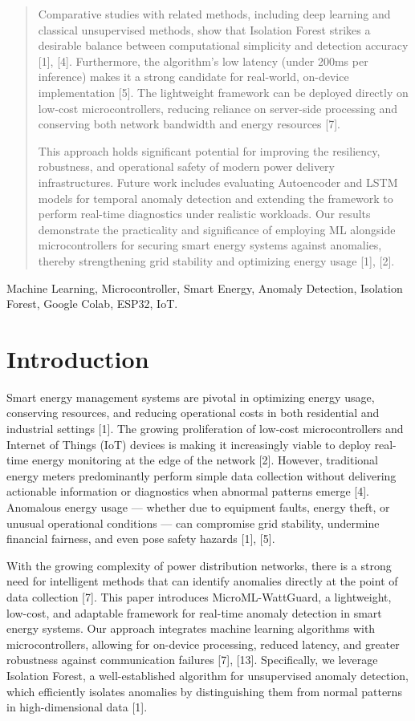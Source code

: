 \documentclass[12pt, draftclsnofoot, onecolumn]{IEEEtran}
\begin{document}
\begin{abstract}
Comparative studies with related methods, including deep learning and classical unsupervised methods, show that Isolation Forest strikes a desirable balance between computational simplicity and detection accuracy [1], [4]. Furthermore, the algorithm’s low latency (under 200ms per inference) makes it a strong candidate for real-world, on-device implementation [5]. The lightweight framework can be deployed directly on low-cost microcontrollers, reducing reliance on server-side processing and conserving both network bandwidth and energy resources [7].

This approach holds significant potential for improving the resiliency, robustness, and operational safety of modern power delivery infrastructures. Future work includes evaluating Autoencoder and LSTM models for temporal anomaly detection and extending the framework to perform real-time diagnostics under realistic workloads. Our results demonstrate the practicality and significance of employing ML alongside microcontrollers for securing smart energy systems against anomalies, thereby strengthening grid stability and optimizing energy usage [1], [2].
\end{abstract}

\begin{IEEEkeywords}
Machine Learning, Microcontroller, Smart Energy, Anomaly Detection, Isolation Forest, Google Colab, ESP32, IoT.
\end{IEEEkeywords}

\section{Introduction}
Smart energy management systems are pivotal in optimizing energy usage, conserving resources, and reducing operational costs in both residential and industrial settings [1]. The growing proliferation of low-cost microcontrollers and Internet of Things (IoT) devices is making it increasingly viable to deploy real-time energy monitoring at the edge of the network [2]. However, traditional energy meters predominantly perform simple data collection without delivering actionable information or diagnostics when abnormal patterns emerge [4]. Anomalous energy usage — whether due to equipment faults, energy theft, or unusual operational conditions — can compromise grid stability, undermine financial fairness, and even pose safety hazards [1], [5].

With the growing complexity of power distribution networks, there is a strong need for intelligent methods that can identify anomalies directly at the point of data collection [7]. This paper introduces MicroML-WattGuard, a lightweight, low-cost, and adaptable framework for real-time anomaly detection in smart energy systems. Our approach integrates machine learning algorithms with microcontrollers, allowing for on-device processing, reduced latency, and greater robustness against communication failures [7], [13]. Specifically, we leverage Isolation Forest, a well-established algorithm for unsupervised anomaly detection, which efficiently isolates anomalies by distinguishing them from normal patterns in high-dimensional data [1].
\end{document}
